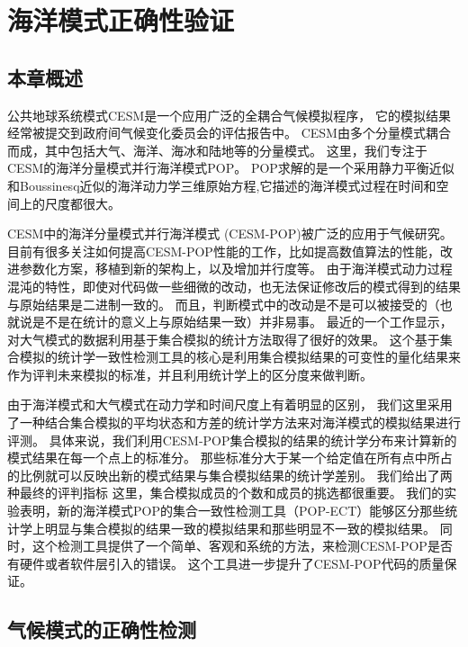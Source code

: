 \chapter{海洋模式正确性验证}
\label{cha:verify}

\section{本章概述}
\label{verify:intro}

公共地球系统模式CESM是一个应用广泛的全耦合气候模拟程序\cite{hurrell2013community}， 它的模拟结果经常被提交到政府间气候变化委员会的评估报告中\cite{stocker2013ipcc}。
CESM由多个分量模式耦合而成，其中包括大气、海洋、海冰和陆地等的分量模式。 
这里，我们专注于CESM的海洋分量模式并行海洋模式POP。  
POP求解的是一个采用静力平衡近似和Boussinesq近似的海洋动力学三维原始方程,它描述的海洋模式过程在时间和空间上的尺度都很大。  

CESM中的海洋分量模式并行海洋模式 (CESM-POP)被广泛的应用于气候研究。 
目前有很多关注如何提高CESM-POP性能的工作，比如提高数值算法的性能，改进参数化方案，移植到新的架构上，以及增加并行度等。 
由于海洋模式动力过程混沌的特性，即使对代码做一些细微的改动，也无法保证修改后的模式得到的结果与原始结果是二进制一致的。 
而且，判断模式中的改动是不是可以被接受的（也就说是不是在统计的意义上与原始结果一致）并非易事。 
最近的一个工作显示，对大气模式的数据利用基于集合模拟的统计方法取得了很好的效果。
这个基于集合模拟的统计学一致性检测工具的核心是利用集合模拟结果的可变性的量化结果来作为评判未来模拟的标准，并且利用统计学上的区分度来做判断。 

由于海洋模式和大气模式在动力学和时间尺度上有着明显的区别， 我们这里采用了一种结合集合模拟的平均状态和方差的统计学方法来对海洋模式的模拟结果进行评测。 
具体来说，我们利用CESM-POP集合模拟的结果的统计学分布来计算新的模式结果在每一个点上的标准分。 
那些标准分大于某一个给定值在所有点中所占的比例就可以反映出新的模式结果与集合模拟结果的统计学差别。 
我们给出了两种最终的评判指标
这里，集合模拟成员的个数和成员的挑选都很重要。
我们的实验表明，新的海洋模式POP的集合一致性检测工具（POP-ECT）能够区分那些统计学上明显与集合模拟的结果一致的模拟结果和那些明显不一致的模拟结果。 
同时，这个检测工具提供了一个简单、客观和系统的方法，来检测CESM-POP是否有硬件或者软件层引入的错误。
这个工具进一步提升了CESM-POP代码的质量保证。 

\section{气候模式的正确性检测}
\label{verify:Backgroud}

